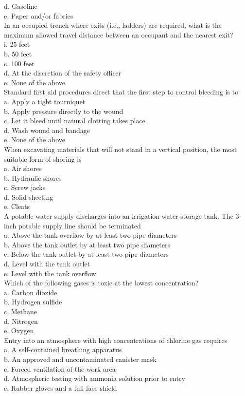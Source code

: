 d. Gasoline\\
e. Paper and/or fabrics\\
  In an occupied trench where exits (i.e., ladders) are required, what is the maximum allowed travel distance between an occupant and the nearest exit?\\
i. 25 feet\\
b. 50 feet\\
c. 100 feet\\
d. At the discretion of the safety officer\\
e. None of the above\\
  Standard first aid procedures direct that the first step to control bleeding is to\\
a. Apply a tight tourniquet\\
b. Apply pressure directly to the wound\\
c. Let it bleed until natural clotting takes place\\
d. Wash wound and bandage\\
e. None of the above\\
  When excavating materials that will not stand in a vertical position, the most suitable form of shoring is\\
a. Air shores\\
b. Hydraulic shores\\
c. Screw jacks\\
d. Solid sheeting\\
e. Cleats\\
  A potable water supply discharges into an irrigation water storage tank. The 3-inch potable supply line should be terminated\\
a. Above the tank overflow by at least two pipe diameters\\
b. Above the tank outlet by at least two pipe diameters\\
c. Below the tank outlet by at least two pipe diameters\\
d. Level with the tank outlet\\
e. Level with the tank overflow\\
  Which of the following gases is toxic at the lowest concentration?\\
a. Carbon dioxide\\
b. Hydrogen sulfide\\
c. Methane\\
d. Nitrogen\\
e. Oxygen\\
  Entry into an atmosphere with high concentrations of chlorine gas requires\\
a. A self-contained breathing apparatus\\
b. An approved and uncontaminated canister mask\\
c. Forced ventilation of the work area\\
d. Atmospheric testing with ammonia solution prior to entry\\
e. Rubber gloves and a full-face shield


